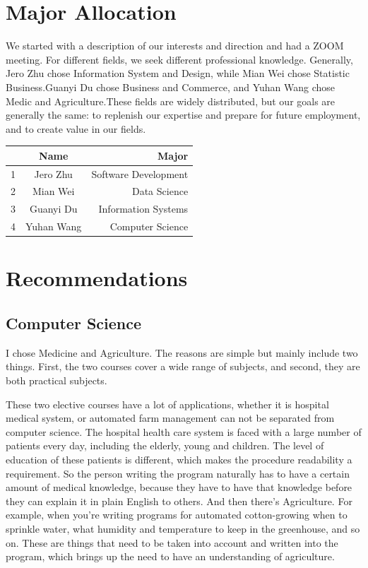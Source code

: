 \documentclass[12pt]{article}
\begin{document}
\section{Major Allocation}
We started with a description of our interests and direction and had a ZOOM meeting. For different fields, we seek different professional knowledge. Generally, Jero Zhu chose Information System and Design, while Mian Wei chose Statistic Business.Guanyi Du chose Business and Commerce, and Yuhan Wang chose Medic and Agriculture.These fields are widely distributed, but our goals are generally the same: to replenish our expertise and prepare for future employment, and to create value in our fields.
\begin{center}
\begin{tabular}{|l|c|r|}
\hline
  & Name      & Major                \\ \hline
1 & Jero Zhu  & Software Development \\ \hline
2 & Mian Wei  & Data Science         \\ \hline
3 & Guanyi Du & Information Systems  \\ \hline
4 & Yuhan Wang & Computer Science    \\ \hline
\end{tabular}
\end{center}

\newpage
\section{Recommendations}

\subsection{Computer Science}
I chose Medicine and Agriculture. The reasons are simple but mainly include two things. First, the two courses cover a wide range of subjects, and second, they are both practical subjects.

These two elective courses have a lot of applications, whether it is hospital medical system, or automated farm management can not be separated from computer science. The hospital health care system is faced with a large number of patients every day, including the elderly, young and children. The level of education of these patients is different, which makes the procedure readability a requirement. So the person writing the program naturally has to have a certain amount of medical knowledge, because they have to have that knowledge before they can explain it in plain English to others. And then there's Agriculture. For example, when you're writing programs for automated cotton-growing when to sprinkle water, what humidity and temperature to keep in the greenhouse, and so on. These are things that need to be taken into account and written into the program, which brings up the need to have an understanding of agriculture.
\end{document}
